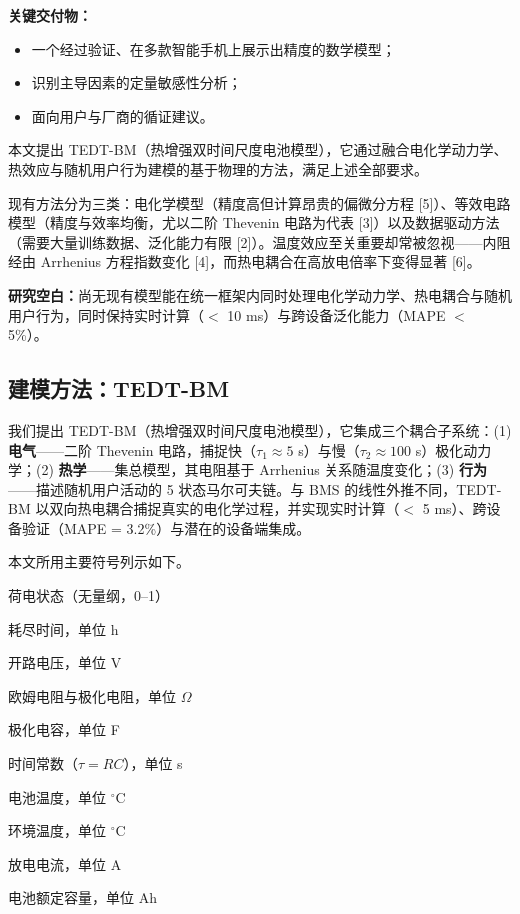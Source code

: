 \documentclass[11pt,a4paper]{ctexart}
\begin{document}
\textbf{关键交付物：}
\begin{itemize}[leftmargin=2em,itemsep=0.15em]
\item 一个经过验证、在多款智能手机上展示出精度的数学模型；
\item 识别主导因素的定量敏感性分析；
\item 面向用户与厂商的循证建议。
\end{itemize}

本文提出 TEDT-BM（热增强双时间尺度电池模型），它通过融合电化学动力学、热效应与随机用户行为建模的基于物理的方法，满足上述全部要求。

现有方法分为三类：电化学模型（精度高但计算昂贵的偏微分方程 [5]）、等效电路模型（精度与效率均衡，尤以二阶 Thevenin 电路为代表 [3]）以及数据驱动方法（需要大量训练数据、泛化能力有限 [2]）。温度效应至关重要却常被忽视——内阻经由 Arrhenius 方程指数变化 [4]，而热电耦合在高放电倍率下变得显著 [6]。

\textbf{研究空白：}尚无现有模型能在统一框架内同时处理电化学动力学、热电耦合与随机用户行为，同时保持实时计算（$<$ 10 ms）与跨设备泛化能力（MAPE $<$ 5\%）。

\subsection{建模方法：TEDT-BM}

我们提出 TEDT-BM（热增强双时间尺度电池模型），它集成三个耦合子系统：(1) \textbf{电气}——二阶 Thevenin 电路，捕捉快（$\tau_1 \approx 5$ s）与慢（$\tau_2 \approx 100$ s）极化动力学；(2) \textbf{热学}——集总模型，其电阻基于 Arrhenius 关系随温度变化；(3) \textbf{行为}——描述随机用户活动的 5 状态马尔可夫链。与 BMS 的线性外推不同，TEDT-BM 以双向热电耦合捕捉真实的电化学过程，并实现实时计算（$<$ 5 ms）、跨设备验证（MAPE = 3.2\%）与潜在的设备端集成。

本文所用主要符号列示如下。

\begin{description}[leftmargin=7.2em,itemsep=0.12em,parsep=0.05em]
\item[$SOC$] 荷电状态（无量纲，0--1）
\item[$TTE$] 耗尽时间，单位 h
\item[$V_{oc}$] 开路电压，单位 V
\item[$R_0,\ R_1,\ R_2$] 欧姆电阻与极化电阻，单位 $\Omega$
\item[$C_1,\ C_2$] 极化电容，单位 F
\item[$\tau_1,\ \tau_2$] 时间常数（$\tau = RC$），单位 s
\item[$T$] 电池温度，单位 $^{\circ}$C
\item[$T_{amb}$] 环境温度，单位 $^{\circ}$C
\item[$I(t)$] 放电电流，单位 A
\item[$Q_{nom}$] 电池额定容量，单位 Ah
\end{description}
\end{document}
